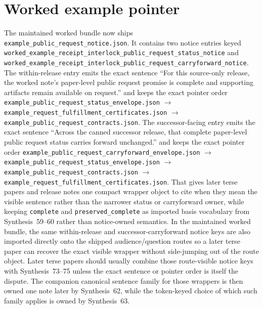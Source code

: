 \documentclass[11pt]{article}
\begin{document}
\section{Worked example pointer}
The maintained worked bundle now ships \nolinkurl{example_public_request_notice.json}.\cite{series:workedexample}
It contains two notice entries keyed \nolinkurl{worked_example_receipt_interlock_public_request_status_notice} and \nolinkurl{worked_example_receipt_interlock_public_request_carryforward_notice}.
The within-release entry emits the exact sentence ``For this source-only release, the worked note's paper-level public request promise is complete and supporting artifacts remain available on request.'' and keeps the exact pointer order
\nolinkurl{example_public_request_status_envelope.json} $\rightarrow$ \nolinkurl{example_request_fulfillment_certificates.json} $\rightarrow$ \nolinkurl{example_public_request_contracts.json}.
The successor-facing entry emits the exact sentence ``Across the canned successor release, that complete paper-level public request status carries forward unchanged.'' and keeps the exact pointer order
\nolinkurl{example_public_request_carryforward_envelope.json} $\rightarrow$ \nolinkurl{example_public_request_status_envelope.json} $\rightarrow$ \nolinkurl{example_public_request_contracts.json} $\rightarrow$ \nolinkurl{example_request_fulfillment_certificates.json}.
That gives later terse papers and release notes one compact wrapper object to cite when they mean the visible sentence rather than the narrower status or carryforward owner, while keeping \nolinkurl{complete} and \nolinkurl{preserved_complete} as imported basis vocabulary from Synthesis~59--60 rather than notice-owned semantics.
In the maintained worked bundle, the same within-release and successor-carryforward notice keys are also imported directly onto the shipped audience/question routes so a later terse paper can recover the exact visible wrapper without side-jumping out of the route object. Later terse papers should usually combine those route-visible notice keys with Synthesis~73--75 unless the exact sentence or pointer order is itself the dispute.
The companion canonical sentence family for those wrappers is then owned one note later by Synthesis~62, while the token-keyed choice of which such family applies is owned by Synthesis~63.\cite{series:publicrequestnoticenormalforms,series:publicrequestnoticeselections,series:publicrequestresponsepacketrefreshresponsepacketclosureverdicts,series:pairedterminalcitationdiscipline,series:pairedterminalcutoverrule}
\end{document}
